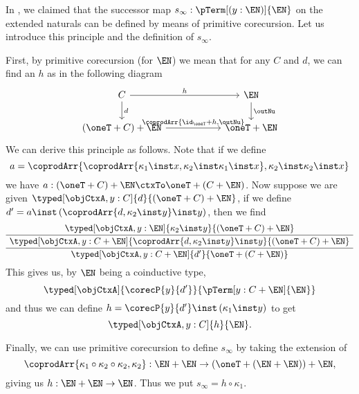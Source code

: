 \documentclass[preprint]{sigplanconf}
\begin{document}
\begin{example}
  In , we claimed that the successor map
  $s_\infty : \pTerm[(y : \EN)]{\EN}$ on the extended naturals can be defined
  by means of primitive corecursion.
  Let us introduce this principle and the definition of $s_\infty$.

  First, by primitive corecursion (for $\EN$) we mean that for any $C$
  and $d$, we can find an $h$ as in the following diagram
  \begin{equation*}
    \begin{tikzcd}[column sep=2cm]
      C \rar{h} \dar{d} & \EN \dar{\outNu} \\
      (\oneT + C) + \EN \rar{\coprodArr{\id_\oneT + h, \outNu}}
      & \oneT + \EN
    \end{tikzcd}
  \end{equation*}
  We can derive this principle as follows.
  Note that if we define
  \begin{equation*}
    a = \coprodArr{
      \coprodArr{\kappa_1 \inst x, \kappa_2 \inst \kappa_1 \inst x},
      \kappa_2 \inst \kappa_2 \inst x
    }
  \end{equation*}
  we have $a : (\oneT + C) + \EN \ctxTo \oneT + (C + \EN)$.
  Now suppose we are given $\typed[\objCtxA, y : C]{d}{(\oneT + C) + \EN}$,
  if we define $d' = a \inst \, (\coprodArr{d,\kappa_2 \inst y} \inst y)$,
  then we find
  \begin{equation*}
\AxiomC{$\typed[\objCtxA, y : \EN]{\kappa_2 \inst y}{(\oneT + C) + \EN}$}
    \UnaryInfC{$
      \typed[\objCtxA, y : C + \EN]{
        \coprodArr{d,\kappa_2 \inst y} \inst y}{(\oneT + C) + \EN}$}
    \UnaryInfC{$\typed[\objCtxA, y : C + \EN]{d'}{\oneT + (C + \EN)}$}
    \DisplayProof
  \end{equation*}
  This gives us, by $\EN$ being a coinductive type,
  \begin{equation*}
    \typed[\objCtxA]{\corecP{y}{d'}}{\pTerm[y:C + \EN]{\EN}}
  \end{equation*}
  and thus we can define $h = \corecP{y}{d'} \inst \, (\kappa_1 \inst y)$
  to get
  \begin{equation*}
    \typed[\objCtxA, y : C]{h}{\EN}.
  \end{equation*}

  Finally, we can use primitive corecursion to define $s_\infty$ by
  taking the extension of
  \begin{equation*}
    \coprodArr{\kappa_1 \circ \kappa_2 \circ \kappa_2, \kappa_2}
    : \EN + \EN \to (\oneT + (\EN + \EN)) + \EN,
  \end{equation*}
  giving us $h : \EN + \EN \to \EN$.
  Thus we put $s_\infty = h \circ \kappa_1$.
  \qedDef
\end{example}
\end{document}
